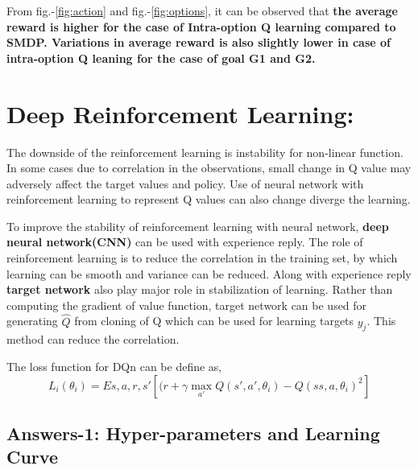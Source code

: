 \documentclass[preprint,12pt]{elsarticle}
\begin{document}
 From fig.-\ref{fig:action} and fig.-\ref{fig:options}, it can be observed that \textbf{the average reward is higher for the case of Intra-option Q learning compared to SMDP. Variations in average reward is also slightly lower in case of intra-option Q leaning for the case of goal G1 and G2.}
 \newpage

\section{Deep Reinforcement Learning:}
 The downside of the reinforcement learning is instability for non-linear function. In some cases due to correlation in the observations, small change in Q value may adversely affect the target values and policy. Use of neural network with reinforcement learning to represent Q values can also change diverge the learning.
 
 To improve the stability of  reinforcement learning with neural network, \textbf{deep neural network(CNN)} can be used with experience reply. The role of  reinforcement learning is to reduce the correlation in the training set, by which learning can be smooth and variance can be reduced. Along with experience reply \textbf{target network} also play major role in stabilization of learning. Rather than computing the gradient of value function, target network can be used for generating $\hat{Q}$ from cloning of Q which can be used for learning targets $y_j$. This method can reduce the correlation.
 
 The loss function for DQn can be define as,
 \begin{equation}
 	L_i(\theta_i)  = E{s,a,r,s'}[(r+\gamma \max_{a'} Q(s',a',\theta_i) - Q(ss,a,\theta_i)^2]
 \end{equation} 
	
\subsection{Answers-1: Hyper-parameters and Learning Curve}	
\end{document}
